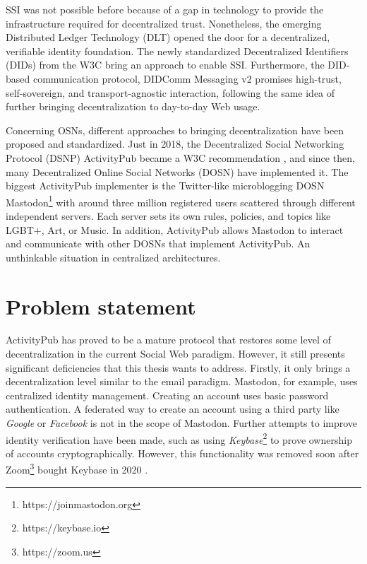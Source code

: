 SSI was not possible before because of a gap in technology to provide the infrastructure required for decentralized trust. Nonetheless, the emerging Distributed Ledger Technology (DLT) opened the door for a decentralized, verifiable identity foundation. The newly standardized Decentralized Identifiers (DIDs) from the W3C bring an approach to enable SSI. Furthermore, the DID-based communication protocol, DIDComm Messaging v2 promises high-trust, self-sovereign, and transport-agnostic interaction, following the same idea of further bringing decentralization to day-to-day Web usage.

Concerning OSNs, different approaches to bringing decentralization have been proposed and standardized. Just in 2018, the Decentralized Social Networking Protocol (DSNP) ActivityPub became a W3C recommendation \cite{lemmer-webber_tallon_guy_prodromou_2018}, and since then, many Decentralized Online Social Networks (DOSN) have implemented it. The biggest ActivityPub implementer is the Twitter-like microblogging DOSN Mastodon\footnote{https://joinmastodon.org} with around three million registered users scattered through different independent servers. Each server sets its own rules, policies, and topics like LGBT+, Art, or Music. In addition, ActivityPub allows Mastodon to interact and communicate with other DOSNs that implement ActivityPub. An unthinkable situation in centralized architectures. 


\section{Problem statement}
 
 ActivityPub has proved to be a mature protocol that restores some level of decentralization in the current Social Web paradigm.  However, it still presents significant deficiencies that this thesis wants to address. Firstly, it only brings a decentralization level similar to the email paradigm. Mastodon, for example, uses centralized identity management. Creating an account uses basic password authentication. A federated way to create an account using a third party like \emph{Google} or \emph{Facebook} is not in the scope of Mastodon. Further attempts to improve identity verification have been made, such as using \emph{Keybase}\footnote{https://keybase.io} to prove ownership of accounts cryptographically. However, this functionality was removed soon after Zoom\footnote{https://zoom.us} bought Keybase in 2020 \cite{rochko_2021}. 

